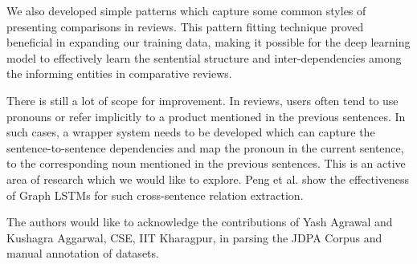 We also developed simple patterns which capture some common styles of presenting comparisons in reviews. This pattern fitting technique proved beneficial in expanding our training data, making it possible for the deep learning model to effectively learn the sentential structure and inter-dependencies among the informing entities in comparative reviews.

There is still a lot of scope for improvement. In reviews, users often tend to use pronouns or refer implicitly to a product mentioned in the previous sentences. In such cases, a wrapper system needs to be developed which can capture the sentence-to-sentence dependencies and map the pronoun in the current sentence, to the corresponding noun mentioned in the previous sentences. This is an active area of research which we would like to explore. Peng et al. \cite{peng2017cross} show the effectiveness of Graph LSTMs for such cross-sentence relation extraction.
\vspace{-0.5em}

\begin{acks}
The authors would like to acknowledge the contributions of Yash Agrawal and Kushagra Aggarwal, CSE, IIT Kharagpur, in parsing the JDPA Corpus and manual annotation of datasets.
\end{acks}
